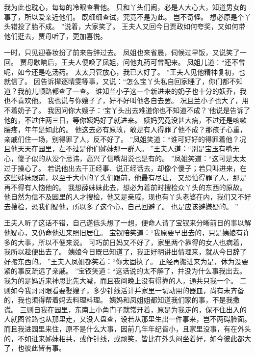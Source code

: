 我为此也耽心，每每的冷眼查看他。
只和丫头们闹，必是人大心大，知道男女的事了，所以爱亲近他们。
既细细查试，究竟不是为此。
岂不奇怪。
想必原是个丫头错投了胎不成。
”说着，大家笑了。
王夫人又回今日贾政如何夸奖，又如何带他们逛去，贾母听了，更加喜悦。
\par
一时，只见迎春妆扮了前来告辞过去。
凤姐也来省晨，伺候过早饭，又说笑了一回。
贾母歇晌后，王夫人便唤了凤姐，问他丸药可曾配来。
凤姐儿道：“还不曾呢，如今还是吃汤药。
太太只管放心，我已大好了。
”王夫人见他精神复初，也就信了。
因告诉撵逐晴雯等事，又说：“怎么宝丫头私自回家睡了，你们都不知道？我前儿顺路都查了一查。
谁知兰小子这一个新进来的奶子也十分的妖乔，我也不喜欢他。
我也说与你嫂子了，好不好叫他各自去罢。
况且兰小子也大了，用不着奶子了。
我因问你大嫂子：‘宝丫头出去难道你也不知道不成？’他说是告诉了他的，不过住两三日，等你姨妈好了就进来。
姨妈究竟没甚大病，不过还是咳嗽腰疼，年年是如此的。
他这去必有原故，敢是有人得罪了他不成？那孩子心重，亲戚们住一场，别得罪了人，反不好了。
”凤姐笑道：“谁可好好的得罪着他？况且他天天在园里，左不过是他们姊妹那一群人。
”王夫人道：“别是宝玉有嘴无心，傻子似的从没个忌讳，高兴了信嘴胡说也是有的。
”凤姐笑道：“这可是太太过于操心了。
若说他出去干正经事、说正经话去，却像个傻子；若只叫进来，在这些姊妹跟前，以至于大小的丫头们跟前，他最有尽让，
又恐怕得罪了人，那是再不得有人恼他的。
我想薛妹妹此去，想必为着前时搜检众丫头的东西的原故。
他自然为信不及园里的人才搜检，他又是亲戚，现也有丫头老婆在内，我们又不好去搜检，恐我们疑他，所以多了这个心，自己回避了。
也是应该避嫌疑的。
”\par
王夫人听了这话不错，自己遂低头想了一想，便命人请了宝钗来分晰前日的事以解他疑心，又仍命他进来照旧居住。
宝钗陪笑道：“我原要早出去的，只是姨娘有许多的大事，所以不便来说。
可巧前日妈又不好了，家里两个靠得的女人也病着，我所以趁便出去了。
姨娘今日既已知道了，我正好明讲出情理来，就从今日辞了好搬东西的。
”王夫人凤姐都笑着：“你太固执了。
正经再搬进来为是，休为没要紧的事反疏远了亲戚。
”宝钗笑道：“这话说的太不解了，并没为什么事我出去。
我为的是妈近来神思比先大减，而且夜间晚上没有得靠的人，通共只我一个。
二则如今我哥哥眼看要娶嫂子，多少针线活计并家里一切动用的器皿，尚有未齐备的，我也须得帮着妈去料理料理。
姨妈和凤姐姐都知道我们家的事，不是我撒谎。
三则自我在园里，东南上小角门子就常开着，原是为我走的，保不住出入的人就图省路也从那里走，又没人盘查，设若从那里生出一件事来，岂不两碍脸面。
而且我进园里来住，原不是什么大事，因前几年年纪皆小，且家里没事，有在外头的，不如进来姊妹相共，或作针线，或顽笑，皆比在外头闷坐着好，如今彼此都大了，也彼此皆有事。
